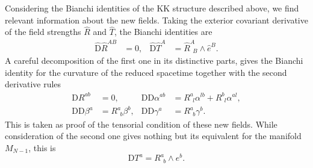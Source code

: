 \documentclass[aps,prd,12pt,superscriptaddress,showpacs,showkeys,longbibliography,reprint]{revtex4-1}
\begin{document}
Considering the Bianchi identities of the KK structure described above, we find relevant information about the new fields. Taking the exterior covariant derivative of the field strengths
$\hat{R}$ and $\hat{T}$, the Bianchi identities are
\begin{align*}
  \hat{\text{D}}\hat{R}^{AB} &= 0, & \hat{\text{D}}\hat{T}^A &= \hat{R}^A_{\ \ B}\wedge\hat{e}^B.
\end{align*}
A careful decomposition of the first one in its distinctive parts, gives the Bianchi identity for the curvature of the reduced spacetime together with the second derivative rules
\begin{align*}
  \text{D}R^{ab} &=0, & \text{D}\mbox{D}\alpha^{ab} &=R^a_{\ \ l}\alpha^{lb}+R^b_{\ \ l}\alpha^{al},\\
  \text{D}\text{D}\beta^a &= R^a_{\ \ b}\beta^{b}, & \text{D}\text{D}\gamma^a &= R^a_{\ \ b}\gamma^{b}.
\end{align*}
This is taken as proof of the tensorial condition of these new fields. While consideration of the second one gives nothing but its equivalent for the manifold $M_{N-1}$, this is
\begin{equation*}
  \mbox{D}T^a=R^a_{\ \ b}\wedge e^b.
\end{equation*}





\end{document}
